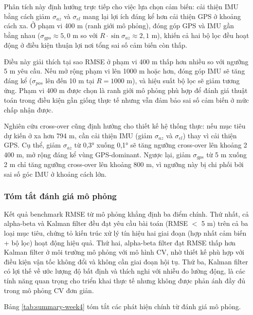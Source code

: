 Phân tích này định hướng trực tiếp cho việc lựa chọn cảm biến: cải thiện IMU bằng cách giảm $\sigma_{az}$ và $\sigma_{el}$ mang lại lợi ích đáng kể hơn cải thiện GPS ở khoảng cách xa. Ở phạm vi 400 m (ranh giới mô phỏng), đóng góp GPS và IMU gần bằng nhau ($\sigma_{gps} \approx 5{,}0$ m so với $R \cdot \sin\sigma_{az} \approx 2{,}1$ m), khiến cả hai bộ lọc đều hoạt động ở điều kiện thuận lợi nơi tổng sai số cảm biến còn thấp.

Điều này giải thích tại sao RMSE ở phạm vi 400 m thấp hơn nhiều so với ngưỡng 5 m yêu cầu. Nếu mở rộng phạm vi lên 1000 m hoặc hơn, đóng góp IMU sẽ tăng đáng kể ($\sigma_{pos}$ lên đến 10 m tại $R = 1000$ m), và hiệu suất bộ lọc sẽ giảm tương ứng. Phạm vi 400 m được chọn là ranh giới mô phỏng phù hợp để đánh giá thuật toán trong điều kiện gần giống thực tế nhưng vẫn đảm bảo sai số cảm biến ở mức chấp nhận được.

Nghiên cứu cross-over cũng định hướng cho thiết kế hệ thống thực: nếu mục tiêu dự kiến ở xa hơn 794 m, cần cải thiện IMU (giảm $\sigma_{az}$ và $\sigma_{el}$) thay vì cải thiện GPS. Cụ thể, giảm $\sigma_{az}$ từ 0,3° xuống 0,1° sẽ tăng ngưỡng cross-over lên khoảng 2 400 m, mở rộng đáng kể vùng GPS-dominant. Ngược lại, giảm $\sigma_{gps}$ từ 5 m xuống 2 m chỉ tăng ngưỡng cross-over lên khoảng 800 m, vì ngưỡng này bị chi phối bởi sai số góc IMU ở khoảng cách lớn.

\subsubsection{Tóm tắt đánh giá mô phỏng}

\hspace{0.5cm} Kết quả benchmark RMSE từ mô phỏng khẳng định ba điểm chính. Thứ nhất, cả alpha-beta và Kalman filter đều đạt yêu cầu bài toán (RMSE $<$ 5 m) trên cả ba loại mục tiêu, chứng tỏ kiến trúc xử lý tín hiệu hai giai đoạn (hợp nhất cảm biến + bộ lọc) hoạt động hiệu quả. Thứ hai, alpha-beta filter đạt RMSE thấp hơn Kalman filter ở môi trường mô phỏng với mô hình CV, nhờ thiết kế phù hợp với điều kiện vận tốc không đổi và không cần giai đoạn hội tụ. Thứ ba, Kalman filter có lợi thế về ước lượng độ bất định và thích nghi với nhiễu đo lường động, là các tính năng quan trọng cho triển khai thực tế nhưng không được phản ánh đầy đủ trong mô phỏng CV đơn giản.

Bảng \ref{tab:summary-week4} tóm tắt các phát hiện chính từ đánh giá mô phỏng.

